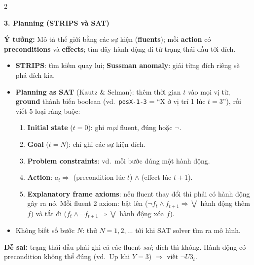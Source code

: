 \documentclass[10pt]{article}
\newcommand{\kw}[1]{\textbf{#1}}
\newcommand{\sect}[1]{\par\vspace{6pt}\noindent\colorbox{h1}{\parbox{\dimexpr\linewidth-2\fboxsep}{\large\bfseries\color{white}#1}}\par\vspace{2pt}}
\newcommand{\idea}[1]{\par\noindent\colorbox{bg}{\parbox{\dimexpr\linewidth-2\fboxsep}{\textbf{Ý tưởng:} #1}}\par}
\newcommand{\warn}[1]{\par\noindent\colorbox{wn}{\parbox{\dimexpr\linewidth-2\fboxsep}{\textbf{Dễ sai:} #1}}\par}
\begin{document}
\begin{multicols}{2}
\sect{3. Planning (STRIPS và SAT)}
\idea{Mô tả thế giới bằng các sự kiện (\kw{fluents}); mỗi \kw{action} có \kw{preconditions} và \kw{effects}; tìm dãy hành động đi từ trạng thái đầu tới đích.}
\begin{itemize}
\item \kw{STRIPS}: tìm kiếm quay lui; \kw{Sussman anomaly}: giải từng đích riêng sẽ phá đích kia.
\item \kw{Planning as SAT} (Kautz \& Selman): thêm thời gian $t$ vào mọi vị từ, \kw{ground} thành biến boolean (vd.\ \texttt{posX-1-3} = ``X ở vị trí 1 lúc $t=3$''), rồi viết 5 loại ràng buộc:
\begin{enumerate}
\item \kw{Initial state} ($t=0$): ghi \emph{mọi} fluent, đúng hoặc $\neg$.
\item \kw{Goal} ($t=N$): chỉ ghi các sự kiện đích.
\item \kw{Problem constraints}: vd.\ mỗi bước đúng một hành động.
\item \kw{Action}: $a_t\Rightarrow$ (precondition lúc $t$) $\wedge$ (effect lúc $t+1$).
\item \kw{Explanatory frame axioms}: nếu fluent thay đổi thì phải có hành động gây ra nó. Mỗi fluent 2 axiom: bật lên ($\neg f_t\wedge f_{t+1}\Rightarrow\bigvee$ hành động thêm $f$) và tắt đi ($f_t\wedge\neg f_{t+1}\Rightarrow\bigvee$ hành động xóa $f$).
\end{enumerate}
\item Không biết số bước $N$: thử $N=1,2,\ldots$ tới khi SAT solver tìm ra mô hình.
\end{itemize}
\warn{trạng thái đầu phải ghi cả các fluent \emph{sai}; đích thì không. Hành động có precondition không thể đúng (vd.\ Up khi $Y=3$) $\Rightarrow$ viết $\neg U3_t$.}


\end{multicols}
\end{document}
